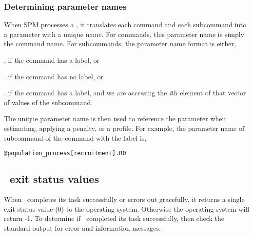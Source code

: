 \subsubsection{Determining parameter names}

When SPM processes a \config, it translates each command and each subcommand into a parameter with a unique name. For commands, this parameter name is simply the command name. For subcommands, the parameter name format is either, 

\begin{description}
\item {}\subcommand{[label]}. if the command has a label, or
\item {}. if the command has no label, or
\item {}\subcommand{[label]}.\subcommand{[i]} if the command has a label, and we are accessing the \emph{i}th element of that vector of values of the subcommand.
\end{description} 

The unique parameter name is then used to reference the parameter when estimating, applying a penalty, or a profile. For example, the parameter name of subcommand  of the command  with the label  is,

\texttt{@population\_process[recruitment].R0}

\subsection{\SPM\ exit status values}

When \SPM\ completes its task successfully or errors out gracefully, it returns a single exit status value (0) to the operating system. Otherwise the operating system will return -1. To determine if \SPM\ completed its task successfully, then check the standard output for error and information messages.
